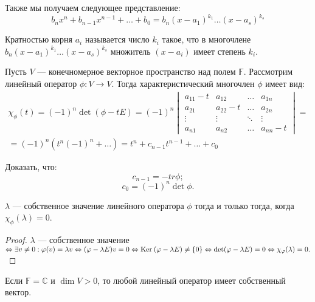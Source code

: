 Также мы получаем следующее представление:
$$
b_nx^n + b_{n-1}x^{n-1} + \ldots + b_0 = b_n(x - a_1)^{k_1}\ldots(x - a_s)^{k_s}
$$

\begin{Def}
	Кратностью корня $a_i$ называется число $k_i$ такое, что в многочлене \\$b_n(x - a_1)^{k_1}\ldots(x - a_s)^{k_s}$ множитель $(x - a_i)$ имеет степень $k_i$.
\end{Def}

\begin{Def}
	Пусть $V$ --- конечномерное векторное пространство над полем $\mathbb{F}$. Рассмотрим линейный оператор $\phi: V \to V$. Тогда характеристический многочлен $\phi$ имеет вид:
	\begin{gather*}
	\chi_{\phi}(t) = (-1)^n\det(\phi - tE) = (-1)^n
  \begin{vmatrix}
  a_{11} - t & a_{12} &\ldots &a_{1n}\\
  a_{21} & a_{22} - t &\ldots &a_{2n} \\
  \vdots &\vdots &\ddots &\vdots\\
  a_{n1} &a_{n2} &\ldots & a_{nn} - t
  \end{vmatrix}
  = \\ 
  = (-1)^n(t^n(-1)^n + \ldots)  = t^n + c_{n-1}t^{n-1} + \ldots + c_0
  \end{gather*}
\end{Def}

\begin{Task}
Доказать, что:
	\[c_{n-1} = -tr\phi;\]
        \[c_0 = (-1)^n \det\phi.\]
\end{Task}

\begin{Statement}
	$\lambda$ --- собственное значение линейного оператора $\phi$ тогда и только тогда, когда $\chi_\phi(\lambda) = 0$. 
\end{Statement}

\begin{proof}
	$\lambda$ --- собственное значение $\Leftrightarrow \exists v \neq 0 : \varphi(v) = \lambda {v} \Leftrightarrow (\varphi - \lambda {E})v = 0 \Leftrightarrow \mathrm{Ker}\:(\varphi - \lambda {E}) \neq \{0\}
	\Leftrightarrow \det(\varphi - \lambda {E}) = 0 \Leftrightarrow \chi_\varphi(\lambda) = 0.$
\end{proof}

\begin{Statement}
	Если $\mathbb{F} = \mathbb{C}$ и $\dim V > 0$, то любой линейный оператор имеет собственный вектор.
\end{Statement}

